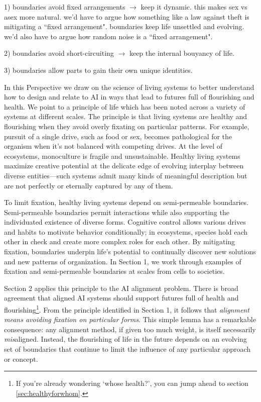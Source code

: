 \documentclass[11pt]{article}
\begin{document}
1) boundaries avoid fixed arrangements $\rightarrow$ keep it dynamic. this makes sex vs asex more natural. we'd have to argue how something like a law against theft is mitigating a ``fixed arrangement". boundaries keep life unsettled and evolving. we'd also have to argue how random noise is a ``fixed arrangement".

2) boundaries avoid short-circuiting $\rightarrow$ keep the internal bouyancy of life. 

3) boundaries allow parts to gain their own unique identities.

In this Perspective we draw on the science of living systems to better understand how to design and relate to AI in ways that lead to futures full of flourishing and health. We point to a principle of life which has been noted across a variety of systems at different scales. The principle is that living systems are healthy and flourishing when they avoid overly fixating on particular patterns. For example, pursuit of a single drive, such as food or sex, becomes pathological for the organism when it's not balanced with competing drives. At the level of ecosystems, monoculture is fragile and unsustainable. Healthy living systems maximize creative potential at the delicate edge of evolving interplay between diverse entities---such systems admit many kinds of meaningful description but are not perfectly or eternally captured by any of them. 

To limit fixation, healthy living systems depend on semi-permeable boundaries. Semi-permeable boundaries permit interactions while also supporting the individuated existence of diverse forms. Cognitive control allows various drives and habits to motivate behavior conditionally; in ecosystems, species hold each other in check and create more complex roles for each other. By mitigating fixation, boundaries underpin life's potential to continually discover new solutions and new patterns of organization. In Section 1, we work through examples of fixation and semi-permeable boundaries at scales from cells to societies.

Section 2 applies this principle to the AI alignment problem. There is broad agreement that aligned AI systems should support futures full of health and flourishing\footnote{If you're already wondering `whose health?', you can jump ahead to section \ref{sec:healthyforwhom}.}. From the principle identified in Section 1, it follows that \textit{alignment means avoiding fixation on particular forms}. This simple lemma has a remarkable consequence: any alignment method, if given too much weight, is itself necessarily \textit{mis}aligned. Instead, the flourishing of life in the future depends on an evolving set of boundaries that continue to limit the influence of any particular approach or concept.
\end{document}
